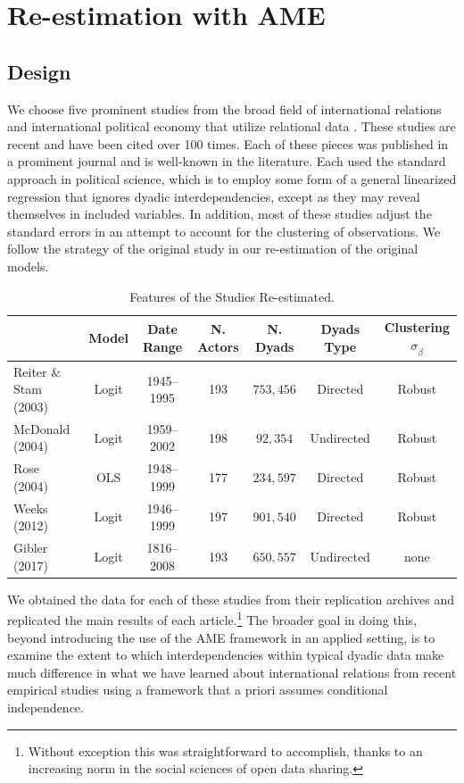 \section{\textbf{Re-estimation with AME}}
 
\subsection{Design}

We choose five prominent studies from the broad field of international relations and international political economy that utilize relational data \citep{reiter:stam:2003, mcdonald:2004,  rose:2004, weeks:2012, gibler:2017}. These studies are recent and have been cited over 100 times. Each of these pieces was published in a prominent journal and is well-known in the literature. Each used the standard approach in political science, which is to employ some form of a general linearized regression that ignores dyadic interdependencies, except as they may reveal themselves in included variables. In addition, most of these studies adjust the standard errors in an attempt to account for the clustering of observations. We follow the strategy of the original study in our re-estimation of the original models. 

\begin{table}
\caption{Features of the Studies Re-estimated.}
	\begin{tabular}{lcccccc}
		& Model &  Date Range & N. Actors  & N. Dyads & Dyads Type & Clustering $\sigma_{\hat{\beta}}$ \\ \toprule
		Reiter \& Stam (2003) &Logit &1945--1995 &  193 & $753,456$ & Directed & Robust \\	
		McDonald (2004) & Logit &1959--2002 & 198 & $92,354$ & Undirected & Robust\\
		Rose (2004) & OLS & 1948--1999 & 177 & $234,597$ & Directed & Robust \\	 
		Weeks (2012) & Logit & 1946--1999 &197 &  $901,540$ & Directed & Robust \\
		Gibler (2017) & Logit & 1816--2008 &193 &   $650,557$ & Undirected & none \\ \bottomrule
	\end{tabular}
\end{table}

We obtained the data for each of these studies from their replication archives and replicated the main results of each article.\footnote{Without exception this was straightforward to accomplish, thanks to an increasing norm in the social sciences of open data sharing.} The broader goal in doing this, beyond introducing the use of the AME framework in an applied setting, is to examine the extent to which interdependencies within typical dyadic data make much difference in what we have learned about international relations from recent empirical studies using a framework that a priori assumes conditional independence. 

